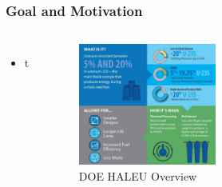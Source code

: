 \begin{frame}
  \frametitle{Goal and Motivation}
        \begin{columns}
                \column[t]{5cm}
                \begin{itemize}
                        \item t
                \end{itemize}

                \column[t]{5cm}
        \begin{figure}[htbp!]
        \begin{center}
      \includegraphics[height=4cm]{./images/HALEU_overview.jpg}
    \end{center}
          \caption{DOE HALEU Overview}
    \label{fig:doe_haleu_overview}
  \end{figure}
        \end{columns}
\end{frame}

